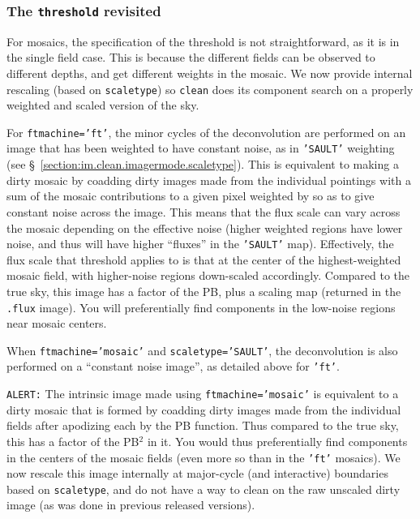 \subsubsection{The {\tt threshold} revisited}
\label{section:im.clean.imagermode.threshold}

For mosaics, the specification of the threshold is not
straightforward, as it is in the single field case.  This is because
the different fields can be observed to different depths, and get
different weights in the mosaic.  We now provide internal rescaling
(based on {\tt scaletype}) so {\tt clean} does
its component search on a properly weighted and scaled version of the sky.

For {\tt ftmachine='ft'}, the minor cycles of the deconvolution are
performed on an image that has been weighted to have constant noise,
as in {\tt 'SAULT'} weighting (see
\S~\ref{section:im.clean.imagermode.scaletype}).  This is equivalent to making
a dirty mosaic by coadding dirty images made from the individual 
pointings with a sum of the mosaic contributions to a given pixel
weighted by so as to give constant noise across the image.
This means that the flux scale can vary across the mosaic depending
on the effective noise (higher weighted regions have lower noise, and
thus will have higher ``fluxes'' in the {\tt 'SAULT'} map).  Effectively,
the flux scale that threshold applies to is that at the center of the
highest-weighted mosaic field, with higher-noise regions down-scaled
accordingly.  Compared to the true sky, this image has a factor of
the PB, plus a scaling map (returned in the {\tt .flux} image).
You will preferentially find components in the low-noise
regions near mosaic centers.

When {\tt ftmachine='mosaic'} and {\tt scaletype='SAULT'}, the
deconvolution is also performed on a ``constant noise image'',
as detailed above for {\tt 'ft'}. 

{\tt ALERT:} The intrinsic image made using {\tt ftmachine='mosaic'} is equivalent
to a dirty mosaic that is formed by coadding dirty images made from
the individual fields after apodizing each by the PB function.  Thus
compared to the true sky, this has a factor of the PB$^2$ in it.  You
would thus preferentially find components in the centers of the mosaic
fields (even more so than in the {\tt 'ft'} mosaics).  We now rescale
this image internally at major-cycle (and interactive) boundaries
based on {\tt scaletype}, and do not have a way to clean on the raw
unscaled dirty image (as was done in previous released versions).

